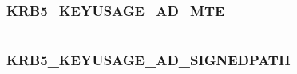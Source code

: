 \documentclass[letterpaper,10pt,english]{sphinxmanual}
\begin{document}
\begin{fulllineitems}
\label{appdev/refs/macros/KRB5_KEYUSAGE_AD_KDCISSUED_CKSUM:KRB5_KEYUSAGE_AD_KDCISSUED_CKSUM}
\end{fulllineitems}


\begin{tabulary}{\linewidth}{|L|L|}
\hline

 & 
\\
\hline\end{tabulary}



\subsubsection{KRB5\_KEYUSAGE\_AD\_MTE}
\label{appdev/refs/macros/KRB5_KEYUSAGE_AD_MTE:krb5-keyusage-ad-mte-data}\label{appdev/refs/macros/KRB5_KEYUSAGE_AD_MTE:krb5-keyusage-ad-mte}\label{appdev/refs/macros/KRB5_KEYUSAGE_AD_MTE::doc}

\begin{fulllineitems}
\label{appdev/refs/macros/KRB5_KEYUSAGE_AD_MTE:KRB5_KEYUSAGE_AD_MTE}
\end{fulllineitems}


\begin{tabulary}{\linewidth}{|L|L|}
\hline

 & 
\\
\hline\end{tabulary}



\subsubsection{KRB5\_KEYUSAGE\_AD\_SIGNEDPATH}
\label{appdev/refs/macros/KRB5_KEYUSAGE_AD_SIGNEDPATH:krb5-keyusage-ad-signedpath-data}\label{appdev/refs/macros/KRB5_KEYUSAGE_AD_SIGNEDPATH::doc}\label{appdev/refs/macros/KRB5_KEYUSAGE_AD_SIGNEDPATH:krb5-keyusage-ad-signedpath}

\begin{fulllineitems}
\label{appdev/refs/macros/KRB5_KEYUSAGE_AD_SIGNEDPATH:KRB5_KEYUSAGE_AD_SIGNEDPATH}
\end{fulllineitems}
\end{document}
